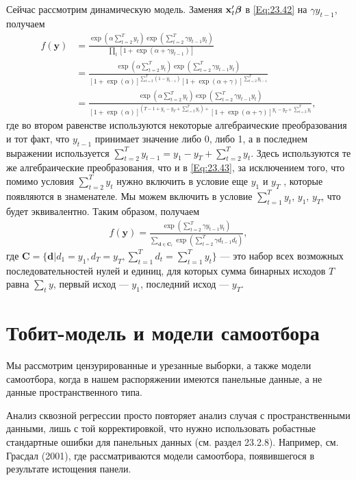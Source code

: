 Сейчас рассмотрим динамическую модель. Заменяя $\mathbf{x}'_t \bm{\beta}$ в \ref{Eq:23.42} на $\gamma y_{t-1}$, получаем 
\begin{align}
f(\mathbf{y})
&= \frac{\exp (\alpha \sum^T_{t=2} y_t) \exp ( \sum^T_{t=2}\gamma y_{t-1} y_t)}{\prod_t [1+\exp (\alpha+\gamma y_{t-1})]} \nonumber \\
&= \frac{\exp (\alpha \sum^T_{t=2} y_t )\exp (\sum^T_{t=2} \gamma y_{t-1} y_t )}{[1+\exp (\alpha)]^{\sum^T_{t=2} (1-y_{t-1})}[1+\exp (\alpha+\gamma)]^{\sum^T_{t=2} y_{t-1}}} \nonumber \\
&= \frac{\exp (\alpha \sum^T_{t=2} y_t) \exp (\sum^T_{t=2} \gamma y_{t-1} y_t)}{[1+\exp (\alpha)]^{(T-1+y_1-y_T+\sum^T_{t=2} y_t)+}[1+\exp (\alpha+\gamma)]^{y_1-y_T+\sum^T_{t=2} y_{t}}}, \nonumber
\end{align}
где во втором равенстве используются некоторые алгебраические преобразования и тот факт, что $y_{t-1}$ принимает значение либо 0, либо 1, а в последнем выражении используется $\sum^T_{t=2} y_{t-1} = y_1 - y_T + \sum^T_{t=2} y_t$. Здесь используются те же алгебраические преобразования, что и в \ref{Eq:23.43}, за исключением того, что помимо условия $\sum^T_{t=2} y_t$ нужно включить в условие  еще $y_1$ и $y_T$ , которые появляются в знаменателе. Мы можем включить в условие $\sum^T_{t=1} y_t$, $y_1$, $y_T$, что будет эквивалентно. Таким образом, получаем
\begin{align}
f(\mathbf{y})=\frac{\exp (\sum^T_{t=2} \gamma y_{t-1} y_t)}{\sum_{\mathbf{d} \in \mathbf{C}_c} \exp (\sum^T_{t=2} \gamma d_{t-1} d_t)},
\nonumber
\end{align}
где $\mathbf{C}=\{ \mathbf{d}| d_1 = y_1, d_T = y_T, \sum^T_{t=1} d_t = \sum^T_{t=1} y_t \}$ --- это набор всех возможных последовательностей нулей и единиц, для которых сумма бинарных исходов $T$ равна $\sum_t y$, первый исход --- $y_1$, последний исход --- $y_T$.

\section{Тобит-модель и модели самоотбора}


Мы рассмотрим цензурированные и урезанные выборки, а также модели самоотбора, когда в нашем распоряжении имеются панельные данные, а не данные пространственного типа.

Анализ сквозной регрессии просто повторяет анализ случая с пространственными данными, лишь с той корректировкой, что нужно использовать робастные стандартные ошибки для панельных данных (см. раздел 23.2.8). Например, см. Грасдал (2001), где рассматриваются модели самоотбора, появившегося в результате истощения панели.

